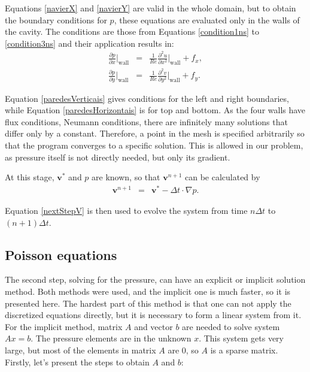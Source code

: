\documentclass[journal]{IEEEtran}
\begin{document}
Equations \ref{navierX} and \ref{navierY} are valid in the whole domain, but to obtain the boundary conditions for $p$, these equations are evaluated only in the walls of the cavity. The conditions are those from Equations \ref{condition1ns} to \ref{condition3ns} and their application results in:\begin{eqnarray}
\frac{\partial p}{\partial x}\Bigg|_{\textrm{wall}}&=&\frac{1}{\mathit{Re}}\frac{\partial^2
u}{\partial x^2}\Bigg|_{\textrm{wall}}+f_x,\label{paredesVerticais}\\
\frac{\partial p}{\partial y}\Bigg|_{\textrm{wall}}&=&\frac{1}{\mathit{Re}}\frac{\partial^2
v}{\partial y^2}\Bigg|_{\textrm{wall}}+f_y.\label{paredesHorizontais}
\end{eqnarray}

Equation \ref{paredesVerticais} gives conditions for the left and right boundaries, while Equation \ref{paredesHorizontais} is for top and bottom. As the four walls have flux conditions, Neumann conditions, there are infinitely many solutions that differ only by a constant. Therefore, a point in the mesh is specified arbitrarily so that the program converges to a specific solution. This is allowed in our problem, as pressure itself is not directly needed, but only its gradient.

At this stage, $\mathbf{v}^*$ and $p$ are known, so that $\mathbf{v}^{n+1}$ can be calculated by \begin{eqnarray}
	\mathbf{v}^{n+1} & = & \mathbf{v}^*  - \Delta t\cdot  \nabla p. \label{nextStepV}
\end{eqnarray}

Equation \ref{nextStepV} is then used to evolve the system from time $n \Delta t$ to $(n+1)\Delta t$. 

\subsection{Poisson equations}

The second step, solving for the pressure, can have an explicit or implicit solution method. Both methods were used, and the implicit one is much faster, so it is presented here. The hardest part of this method is that one can not apply the discretized equations directly, but it is necessary to form a linear system from it. For the implicit method, matrix $A$ and vector $b$ are needed to solve system $Ax = b$. The pressure elements are in the unknown $x$. This system gets very large, but most of the elements in matrix $A$ are 0, so $A$ is a sparse matrix. Firstly, let's present the steps to obtain $A$ and $b$:
\end{document}
